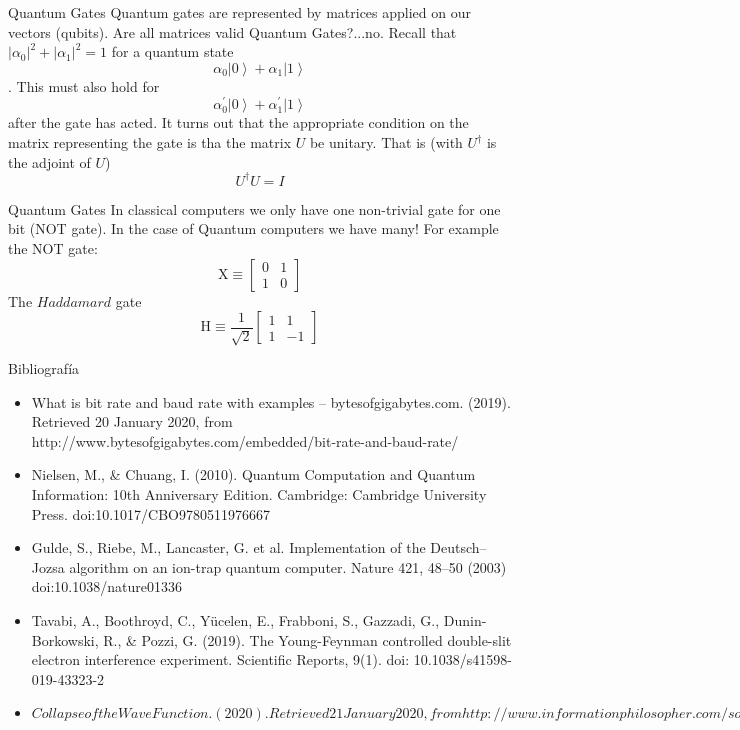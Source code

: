 \documentclass{beamer}
\newcommand{\ket}[1]{\left| #1 \right>} %
\begin{document}
\begin{frame}{Quantum Gates}
	\justifying
	Quantum gates are represented by matrices applied on our vectors (qubits). Are all matrices valid Quantum Gates?...no.
	\newline
    \newline
	Recall that  ${|\alpha_0|}^2+|\alpha_1|^2=1$ for a quantum state 
	$$\alpha_0 \ket{0} + \alpha_1 \ket{1}$$.
	This must also hold for 
	$$\alpha_0^{'}  \ket{0} + \alpha_1^{'} \ket{1}$$
	after the gate has acted. It turns out that the appropriate condition on the matrix representing the gate is tha the matrix $U$ be unitary. That is (with $U^{\dagger}$ is the adjoint of $U$)
	$$U^{\dagger}U=I$$

\end{frame}	

\begin{frame}{Quantum Gates}
	\justifying 
	In classical computers we only have one non-trivial gate for one bit (NOT gate). In the case of Quantum computers we have many!
	\newline
	\newline
	For example the NOT gate:
	$$\mathrm{X} \equiv \begin{bmatrix} 0 & 1 \\ 
										1 & 0 \end{bmatrix}$$
	The $Haddamard$ gate
	$$\mathrm{H} \equiv \frac{1}{\sqrt{2}}\begin{bmatrix} 1 & 1 \\ 
	1 & -1 \end{bmatrix}$$

\end{frame}

\begin{frame}{Bibliografía}
	\begin{itemize}
		\item What is bit rate and baud rate with examples – bytesofgigabytes.com. (2019). Retrieved 20 January 2020, from http://www.bytesofgigabytes.com/embedded/bit-rate-and-baud-rate/
		      \newline
		\item {Nielsen, M., \& Chuang, I. (2010). Quantum Computation and Quantum Information: 10th Anniversary Edition. Cambridge: Cambridge University Press. doi:10.1017/CBO9780511976667}
		      \newline
		\item {Gulde, S., Riebe, M., Lancaster, G. et al. Implementation of the Deutsch–Jozsa algorithm on an ion-trap quantum computer. Nature 421, 48–50 (2003) doi:10.1038/nature01336}
		\item Tavabi, A., Boothroyd, C., Yücelen, E., Frabboni, S., Gazzadi, G., Dunin-Borkowski, R., \& Pozzi, G. (2019). The Young-Feynman controlled double-slit electron interference experiment. Scientific Reports, 9(1). doi: 10.1038/s41598-019-43323-2
		\item $Collapse of the Wave Function. (2020). Retrieved 21 January 2020, from http://www.informationphilosopher.com/solutions/experiments/wave-function_collapse/$
	\end{itemize}
\end{frame}
\end{document}
